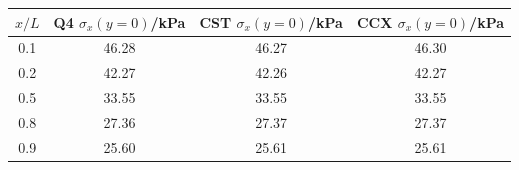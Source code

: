 \begin{tabular}{@{}S[table-format=1.1]S[table-format=2.2]S[table-format=2.2]S[table-format=2.2]@{}}
\toprule
{$x/L$} & {Q4 $\sigma_x(y=0)$/kPa} & {CST $\sigma_x(y=0)$/kPa} & {CCX $\sigma_x(y=0)$/kPa} \\
 & 46.28 & 46.27 & 46.30 \\
0.2 & 42.27 & 42.26 & 42.27 \\
0.5 & 33.55 & 33.55 & 33.55 \\
0.8 & 27.36 & 27.37 & 27.37 \\
0.9 & 25.60 & 25.61 & 25.61 \\
\bottomrule
\end{tabular}
